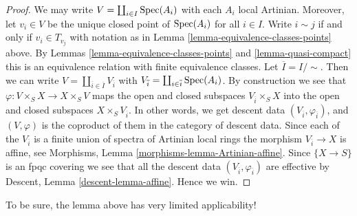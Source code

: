 \begin{proof}
We may write $V = \coprod_{i \in I} \mathop{\rm Spec}(A_i)$
with each $A_i$ local Artinian. Moreover, let
$v_i \in V$ be the unique closed point of $\mathop{\rm Spec}(A_i)$
for all $i \in I$. Write $i \sim j$ if and only if
$v_i \in T_{v_j}$ with notation as in
Lemma \ref{lemma-equivalence-classes-points} above.
By Lemmas \ref{lemma-equivalence-classes-points} and \ref{lemma-quasi-compact}
this is an equivalence relation with finite equivalence
classes. Let $\overline{I} = I/\sim$. Then we can write
$V = \coprod_{\overline{i} \in \overline{I}} V_{\overline{i}}$
with
$V_{\overline{i}} = \coprod_{i \in \overline{i}} \mathop{\rm Spec}(A_i)$.
By construction we see that
$\varphi : V \times_S X \to X \times_S V$ maps
the open and closed subspaces $V_{\overline{i}} \times_S X$
into the open and closed subspaces $X \times_S V_{\overline{i}}$.
In other words, we get descent data
$(V_{\overline{i}}, \varphi_{\overline{i}})$, and
$(V, \varphi)$ is the coproduct of them in the category of
descent data.
Since each of the $V_{\overline{i}}$ is a finite union of
spectra of Artinian local rings the morphism $V_{\overline{i}} \to X$
is affine, see Morphisms, Lemma \ref{morphisms-lemma-Artinian-affine}.
Since $\{X \to S\}$ is an fpqc covering we see that all
the descent data $(V_{\overline{i}}, \varphi_{\overline{i}})$ are effective
by Descent, Lemma \ref{descent-lemma-affine}.
Hence we win.
\end{proof}

\noindent
To be sure, the lemma above has very limited applicability!


















